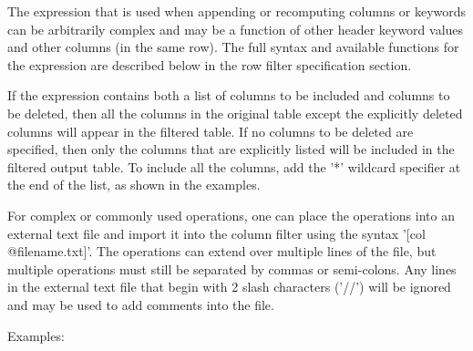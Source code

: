 \documentclass[11pt]{book}
\begin{document}
The expression that is used when appending or recomputing columns or
keywords can be arbitrarily complex and may be a function of other
header keyword values and other columns (in the same row).  The full
syntax and available functions for the expression are described below
in the row filter specification section.

If the expression contains both a list of columns to be included and
columns to be deleted, then all the columns in the original table
except the explicitly deleted columns will appear in the filtered
table.  If no columns to be deleted are specified, then only the
columns that are explicitly listed will be included in the filtered
output table.  To include all the columns, add the '*' wildcard
specifier at the end of the list, as shown in the examples.

For  complex  or commonly used operations,  one  can  place the
operations into an external text  file and import it  into the  column
filter using  the syntax '[col @filename.txt]'.   The operations can
extend over multiple lines of the  file, but multiple operations must
still be separated by commas or semi-colons.   Any lines in the external text file
that begin with 2 slash characters ('//') will be ignored and may be
used to add comments into the file.

Examples:
\end{document}
